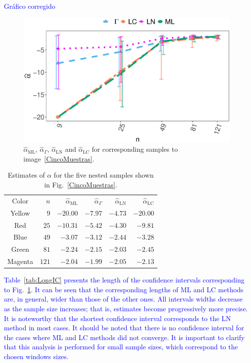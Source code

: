 \documentclass[twocolumn]{svjour3}
\begin{document}
	\textcolor{blue}{Gráfico corregido}
	\begin{figure}[hbt]
		\centering
		\includegraphics[width=0.8\linewidth]{../../../Figures/PaperTesis/AlfaVsTamCincoMuestrasCorregido_v2.eps}
		\caption{ $\widehat{\alpha}_{\text{{ML}}}$, $\widehat{\alpha}_{\Gamma}$, $\widehat{\alpha}_{\text{{LN}}}$ and $\widehat{\alpha}_{\text{{LC}}}$ for corresponding samples to image~\ref{CincoMuestras}.}\label{AlfaVsTamCincoMuestras}
	\end{figure}
	
	\begin{table}[hbt]
		\centering
		\caption{Estimates of ${\alpha}$ for the five nested samples shown in Fig.~\ref{CincoMuestras}.}\label{TablaCincoMuestras} 
		\begin{tabular}{c*5{r}}
			\toprule
			Color       &  $n$    &  $\widehat{\alpha}_{\text{{ML}}}$    &  $\widehat{\alpha}_{\Gamma}$  &  $\widehat{\alpha}_{\text{{LN}}}$ &  $\widehat{\alpha}_{\text{{LC}}}$\\
			\cmidrule(lr){1-6}
			Yellow      & $9$     & $-20.00$      & $-7.97$ & $-4.73$ & $-20.00$\\
			Red         & $25$    & $-10.31$  & $-5.42$ & $-4.30$ & $-9.81$\\
			Blue        & $49$    & $-3.07$   & $-3.12$ & $-2.44$ & $-3.28$\\
			Green       & $81$    & $-2.24$   & $-2.15$ & $-2.03$ & $-2.45$\\
			Magenta     & $121$   & $-2.04$   & $-1.99$ & $-2.05$ & $-2.13$\\
			\bottomrule
		\end{tabular}
	\end{table}

	\textcolor{blue}{
	Table~\ref{tab:LongIC} presents the length of the confidence intervals corresponding to Fig.~\ref{AlfaVsTamCincoMuestras}. It can be seen that the corresponding lengths of ML and LC methods are, in general, wider than those of the other ones. All intervals widths decrease as the sample size increases; that is, estimates become progressively more precise. 
	It is noteworthy that the shortest confidence interval corresponds to the LN method in most cases. 
	It should be noted that there is no confidence interval for the cases where ML and LC methods did not converge.
	It is important to clarify that this analysis is performed for small sample sizes, which correspond to the chosen windows sizes. 
}
	
\end{document}
